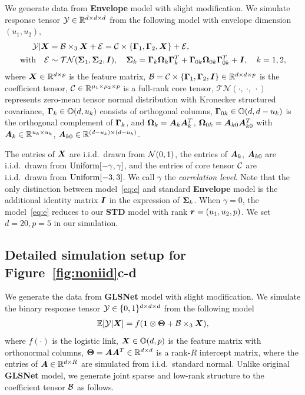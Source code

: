 \documentclass[12pt]{article}
\theoremstyle{definition}
\begin{document}
We generate data from \textbf{Envelope} model \citep{li2017parsimonious} with slight modification. We simulate response tensor $\mathcal{Y}\in\mathbb{R}^{d\times d\times d}$ from the following model with envelope dimension $(u_1, u_2)$,
\begin{align}\label{eq:e}
    \mathcal{Y}|\bm X &= \mathcal{B} \times_3 \bm X + \mathcal{E} = \mathcal{C} \times \{\bm{\Gamma}_1, \bm{\Gamma}_2,\bm X\}+ \mathcal{E}, \notag \\
    \text{with} \quad \mathcal{E} &\sim \mathcal{TN}(\bm \Sigma_1, \bm \Sigma_2, \bm I), \quad \bm \Sigma_k = \bm{\Gamma}_k \bm \Omega_k \bm{\Gamma}_k^T + \bm{\Gamma}_{0k} \bm \Omega_{0k} \bm{\Gamma}_{0k}^T+\bm I, \quad k = 1,2,
\end{align}
 where $\bm X\in\mathbb{R}^{d\times p}$ is the feature matrix, $\mathcal{B}=\mathcal{C}\times\{\bm{\Gamma}_1,\bm{\Gamma}_2, \bm I\}\in \mathbb{R}^{d\times d\times p}$ is the coefficient tensor, $\mathcal{C}\in\mathbb{R}^{\mu_1\times \mu_2\times p}$ is a full-rank core tensor, $\mathcal{TN}(\cdot,\ \cdot,\ \cdot)$ represents zero-mean tensor normal distribution with Kronecker structured covariance, 
 $\bm{\Gamma}_{k} \in \mathbb{O}(d,u_k)$ 
 consists of orthogonal columns, $\bm{\Gamma}_{0k} \in \mathbb{O}(d,d-u_k)$ is the orthogonal complement of $\bm{\Gamma}_k$, and  $\bm \Omega_k = \bm A_k\bm A_k^T$, $\bm \Omega_{0k} = \bm A_{k0}\bm A_{k0}^T$ with $\bm A_k \in \mathbb{R}^{u_k \times u_k}$,  $\bm A_{k0} \in \mathbb{R}^{(d - u_k) \times (d - u_k)}$. 

 
The entries of $\bm X$ are i.i.d.\ drawn from $\mathcal{N}(0,1)$, the entries of $\bm A_k$, $\bm A_{k0}$ are i.i.d.\ drawn from $\textup{Uniform}[-\gamma, \gamma]$, and the entries of core tensor $\mathcal{C}$ are i.i.d.\ drawn from $\textup{Uniform}[-3,  3]$. We call $\gamma$ the \textit{correlation level}. Note that the only distinction between model~\eqref{eq:e} and standard {\bf Envelope} model is the additional identity matrix $\bm I$ in the expression of $\bm \Sigma_k$. When $\gamma = 0$, the model~\eqref{eq:e} reduces to our \textbf{STD} model with rank $\bm{r} = (u_1,u_2,p)$. We set $d=20, p=5$ in our simulation.  

\subsection{Detailed simulation setup for Figure~\ref{fig:noniid}c-d}

We generate the data from \textbf{GLSNet} model \citep{zhang2018network} with slight modification. We simulate the binary response tensor $\mathcal{Y} \in \{0,1\}^{d \times d \times d}$ from the following model
\begin{align}
    \mathbb{E}[\mathcal{Y}|\bm X] = f({\bf 1} \otimes {\bf \Theta} + \mathcal{B} \times_3 \bm X),
\end{align}
where $f(\cdot)$ is the logistic link, $\bm X \in \mathbb{O}(d,p)$ is the feature matrix with orthonormal columns, ${\bf \Theta}=\bm A \bm A^T \in \mathbb{R}^{ d \times d }$ is a rank-$R$  intercept matrix, where the entries of $\bm A \in \mathbb{R}^{d \times R}$ are simulated from i.i.d.\ standard normal. 
Unlike original \textbf{GLSNet} model, we generate joint sparse and low-rank structure to the coefficient tensor $\mathcal{B}$ as follows. 
\end{document}
